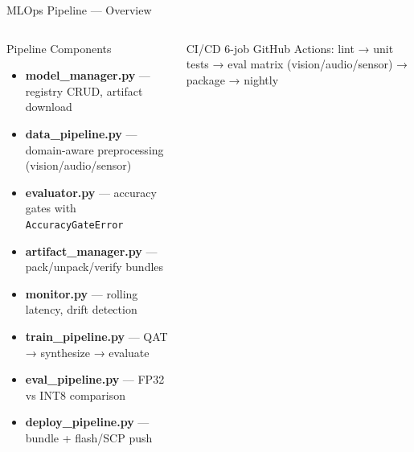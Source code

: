 \documentclass[aspectratio=169,10pt]{beamer}
\begin{document}
\begin{frame}{MLOps Pipeline — Overview}
\begin{columns}[T]
    \begin{block}{Pipeline Components}
      {\small
      \begin{itemize}
        \item \textbf{model\_manager.py} — registry CRUD, artifact download
        \item \textbf{data\_pipeline.py} — domain-aware preprocessing (vision/audio/sensor)
        \item \textbf{evaluator.py} — accuracy gates with \texttt{AccuracyGateError}
        \item \textbf{artifact\_manager.py} — pack/unpack/verify bundles
        \item \textbf{monitor.py} — rolling latency, drift detection
        \item \textbf{train\_pipeline.py} — QAT → synthesize → evaluate
        \item \textbf{eval\_pipeline.py} — FP32 vs INT8 comparison
        \item \textbf{deploy\_pipeline.py} — bundle + flash/SCP push
      \end{itemize}}
    \end{block}
    \vspace{4pt}
    \begin{alertblock}{CI/CD}
      {\small 6-job GitHub Actions: lint → unit tests → eval matrix (vision/audio/sensor) → package → nightly}
    \end{alertblock}
  \end{columns}
\end{frame}
\end{document}
